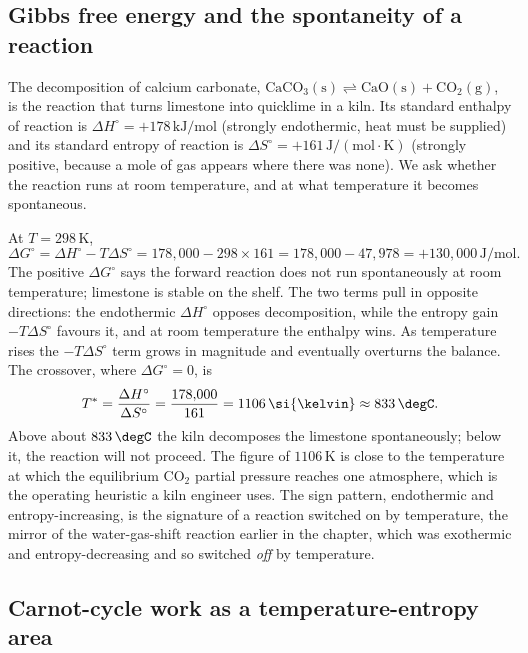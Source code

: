 

\subsection{Gibbs free energy and the spontaneity of a reaction}

The decomposition of calcium carbonate, $\text{CaCO}_3(\text{s})
\rightleftharpoons \text{CaO}(\text{s}) + \text{CO}_2(\text{g})$, is the
reaction that turns limestone into quicklime in a kiln. Its standard
enthalpy of reaction is $\Delta H^\circ = +178\,\text{kJ}/\text{mol}$
(strongly endothermic, heat must be supplied) and its standard entropy of
reaction is $\Delta S^\circ = +161\,\text{J}/(\text{mol}\cdot\si{\kelvin})$
(strongly positive, because a mole of gas appears where there was none).
We ask whether the reaction runs at room temperature, and at what
temperature it becomes spontaneous.

At $T = 298\,\si{\kelvin}$,
\[
\Delta G^\circ = \Delta H^\circ - T\Delta S^\circ
= 178{,}000 - 298 \times 161
= 178{,}000 - 47{,}978
= +130{,}000\,\text{J}/\text{mol}.
\]
The positive $\Delta G^\circ$ says the forward reaction does not run
spontaneously at room temperature; limestone is stable on the shelf. The
two terms pull in opposite directions: the endothermic $\Delta H^\circ$
opposes decomposition, while the entropy gain $-T\Delta S^\circ$ favours
it, and at room temperature the enthalpy wins. As temperature rises the
$-T\Delta S^\circ$ term grows in magnitude and eventually overturns the
balance. The crossover, where $\Delta G^\circ = 0$, is
\[
T^\ast = \frac{\Delta H^\circ}{\Delta S^\circ}
= \frac{178{,}000}{161}
= 1106\,\si{\kelvin} \approx 833\,\degC.
\]
Above about $833\,\degC$ the kiln decomposes the limestone
spontaneously; below it, the reaction will not proceed. The figure of
$1106\,\si{\kelvin}$ is close to the temperature at which the equilibrium
$\text{CO}_2$ partial pressure reaches one atmosphere, which is the
operating heuristic a kiln engineer uses. The sign pattern, endothermic
and entropy-increasing, is the signature of a reaction switched on by
temperature, the mirror of the water-gas-shift reaction earlier in the
chapter, which was exothermic and entropy-decreasing and so switched
\emph{off} by temperature.

\subsection{Carnot-cycle work as a temperature-entropy area}


